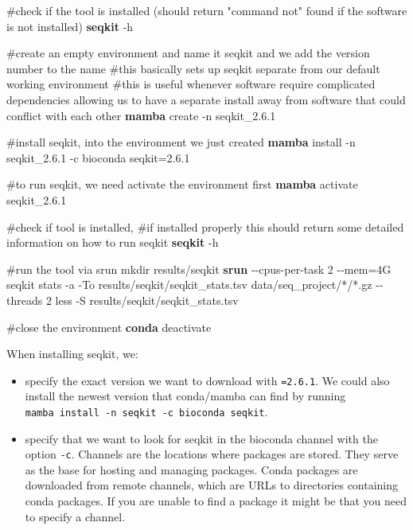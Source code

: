 \documentclass[
  letterpaper,
  DIV=11,
  numbers=noendperiod]{scrreprt}
\newenvironment{Shaded}{}{}
\newcommand{\AttributeTok}[1]{\textcolor[rgb]{0.84,0.23,0.29}{#1}}
\newcommand{\CommentTok}[1]{\textcolor[rgb]{0.42,0.45,0.49}{#1}}
\newcommand{\ExtensionTok}[1]{\textcolor[rgb]{0.84,0.23,0.29}{\textbf{#1}}}
\newcommand{\FunctionTok}[1]{\textcolor[rgb]{0.44,0.26,0.76}{#1}}
\newcommand{\NormalTok}[1]{\textcolor[rgb]{0.14,0.16,0.18}{#1}}
\newcommand{\OperatorTok}[1]{\textcolor[rgb]{0.14,0.16,0.18}{#1}}
\newcommand{\PreprocessorTok}[1]{\textcolor[rgb]{0.84,0.23,0.29}{#1}}
\providecommand{\tightlist}{%
  \setlength{\itemsep}{0pt}\setlength{\parskip}{0pt}}\usepackage{longtable,booktabs,array}
\begin{document}
\begin{Shaded}
\begin{Highlighting}[]
\CommentTok{\#check if the tool is installed (should return "command not" found if the software is not installed)}
\ExtensionTok{seqkit} \AttributeTok{{-}h}

\CommentTok{\#create an empty environment and name it seqkit and we add the version number to the name}
\CommentTok{\#this basically sets up seqkit separate from our default working environment}
\CommentTok{\#this is useful whenever software require complicated dependencies allowing us to have a separate install away from software that could conflict with each other}
\ExtensionTok{mamba}\NormalTok{ create }\AttributeTok{{-}n}\NormalTok{ seqkit\_2.6.1}

\CommentTok{\#install seqkit, into the environment we just created}
\ExtensionTok{mamba}\NormalTok{ install }\AttributeTok{{-}n}\NormalTok{ seqkit\_2.6.1 }\AttributeTok{{-}c}\NormalTok{ bioconda seqkit=2.6.1}

\CommentTok{\#to run seqkit, we need activate the environment first}
\ExtensionTok{mamba}\NormalTok{ activate seqkit\_2.6.1}

\CommentTok{\#check if tool is installed, }
\CommentTok{\#if installed properly this should return some detailed information on how to run seqkit}
\ExtensionTok{seqkit} \AttributeTok{{-}h}

\CommentTok{\#run the tool via srun}
\FunctionTok{mkdir}\NormalTok{ results/seqkit}
\ExtensionTok{srun} \AttributeTok{{-}{-}cpus{-}per{-}task}\NormalTok{ 2 }\AttributeTok{{-}{-}mem}\OperatorTok{=}\NormalTok{4G seqkit stats }\AttributeTok{{-}a} \AttributeTok{{-}To}\NormalTok{ results/seqkit/seqkit\_stats.tsv data/seq\_project/}\PreprocessorTok{*}\NormalTok{/}\PreprocessorTok{*}\NormalTok{.gz }\AttributeTok{{-}{-}threads}\NormalTok{ 2}
\FunctionTok{less} \AttributeTok{{-}S}\NormalTok{ results/seqkit/seqkit\_stats.tsv }

\CommentTok{\#close the environment}
\ExtensionTok{conda}\NormalTok{ deactivate}
\end{Highlighting}
\end{Shaded}

When installing seqkit, we:

\begin{itemize}
\tightlist
\item
  specify the exact version we want to download with \texttt{=2.6.1}. We
  could also install the newest version that conda/mamba can find by
  running \texttt{mamba\ install\ -n\ seqkit\ -c\ bioconda\ seqkit}.
\item
  specify that we want to look for seqkit in the bioconda channel with
  the option \texttt{-c}. Channels are the locations where packages are
  stored. They serve as the base for hosting and managing packages.
  Conda packages are downloaded from remote channels, which are URLs to
  directories containing conda packages. If you are unable to find a
  package it might be that you need to specify a channel.
\end{itemize}
\end{document}
